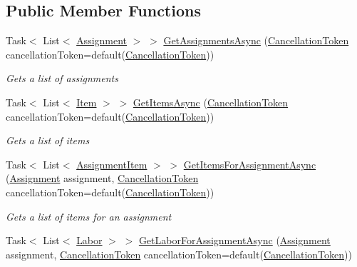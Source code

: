 \subsection*{Public Member Functions}
\begin{DoxyCompactItemize}
\item 
Task$<$ List$<$ \hyperlink{class_field_service_1_1_data_1_1_assignment}{Assignment} $>$ $>$ \hyperlink{class_field_service_1_1_data_1_1_sample_assignment_service_a5bb18ced159187fc6eed77fa9c9a043d}{Get\+Assignments\+Async} (\hyperlink{_view_models_2_assignment_view_model_8cs_aba80ec766846c61f55644fd23860cb18}{Cancellation\+Token} cancellation\+Token=default(\hyperlink{_view_models_2_assignment_view_model_8cs_aba80ec766846c61f55644fd23860cb18}{Cancellation\+Token}))
\begin{DoxyCompactList}\small\item\em Gets a list of assignments \end{DoxyCompactList}\item 
Task$<$ List$<$ \hyperlink{class_field_service_1_1_data_1_1_item}{Item} $>$ $>$ \hyperlink{class_field_service_1_1_data_1_1_sample_assignment_service_a8b659dc7519b081133fc3f56abdb0fd0}{Get\+Items\+Async} (\hyperlink{_view_models_2_assignment_view_model_8cs_aba80ec766846c61f55644fd23860cb18}{Cancellation\+Token} cancellation\+Token=default(\hyperlink{_view_models_2_assignment_view_model_8cs_aba80ec766846c61f55644fd23860cb18}{Cancellation\+Token}))
\begin{DoxyCompactList}\small\item\em Gets a list of items \end{DoxyCompactList}\item 
Task$<$ List$<$ \hyperlink{class_field_service_1_1_data_1_1_assignment_item}{Assignment\+Item} $>$ $>$ \hyperlink{class_field_service_1_1_data_1_1_sample_assignment_service_a4708e2ceb558374a3e61ba07da6ae38d}{Get\+Items\+For\+Assignment\+Async} (\hyperlink{class_field_service_1_1_data_1_1_assignment}{Assignment} assignment, \hyperlink{_view_models_2_assignment_view_model_8cs_aba80ec766846c61f55644fd23860cb18}{Cancellation\+Token} cancellation\+Token=default(\hyperlink{_view_models_2_assignment_view_model_8cs_aba80ec766846c61f55644fd23860cb18}{Cancellation\+Token}))
\begin{DoxyCompactList}\small\item\em Gets a list of items for an assignment \end{DoxyCompactList}\item 
Task$<$ List$<$ \hyperlink{class_field_service_1_1_data_1_1_labor}{Labor} $>$ $>$ \hyperlink{class_field_service_1_1_data_1_1_sample_assignment_service_a0f4d7cf9022074d8100f285441fdb3b6}{Get\+Labor\+For\+Assignment\+Async} (\hyperlink{class_field_service_1_1_data_1_1_assignment}{Assignment} assignment, \hyperlink{_view_models_2_assignment_view_model_8cs_aba80ec766846c61f55644fd23860cb18}{Cancellation\+Token} cancellation\+Token=default(\hyperlink{_view_models_2_assignment_view_model_8cs_aba80ec766846c61f55644fd23860cb18}{Cancellation\+Token}))

\end{DoxyCompactItemize}
